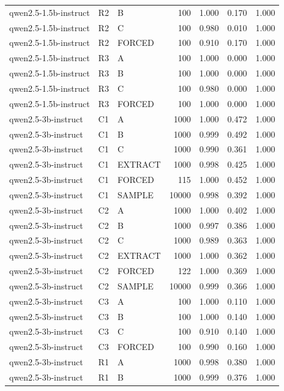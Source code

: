 \begin{table}
\begin{tabular}{lllrrrr}
qwen2.5-1.5b-instruct & R2 & B & 100 & 1.000 & 0.170 & 1.000 \\
qwen2.5-1.5b-instruct & R2 & C & 100 & 0.980 & 0.010 & 1.000 \\
qwen2.5-1.5b-instruct & R2 & FORCED & 100 & 0.910 & 0.170 & 1.000 \\
qwen2.5-1.5b-instruct & R3 & A & 100 & 1.000 & 0.000 & 1.000 \\
qwen2.5-1.5b-instruct & R3 & B & 100 & 1.000 & 0.000 & 1.000 \\
qwen2.5-1.5b-instruct & R3 & C & 100 & 0.980 & 0.000 & 1.000 \\
qwen2.5-1.5b-instruct & R3 & FORCED & 100 & 1.000 & 0.000 & 1.000 \\
qwen2.5-3b-instruct & C1 & A & 1000 & 1.000 & 0.472 & 1.000 \\
qwen2.5-3b-instruct & C1 & B & 1000 & 0.999 & 0.492 & 1.000 \\
qwen2.5-3b-instruct & C1 & C & 1000 & 0.990 & 0.361 & 1.000 \\
qwen2.5-3b-instruct & C1 & EXTRACT & 1000 & 0.998 & 0.425 & 1.000 \\
qwen2.5-3b-instruct & C1 & FORCED & 115 & 1.000 & 0.452 & 1.000 \\
qwen2.5-3b-instruct & C1 & SAMPLE & 10000 & 0.998 & 0.392 & 1.000 \\
qwen2.5-3b-instruct & C2 & A & 1000 & 1.000 & 0.402 & 1.000 \\
qwen2.5-3b-instruct & C2 & B & 1000 & 0.997 & 0.386 & 1.000 \\
qwen2.5-3b-instruct & C2 & C & 1000 & 0.989 & 0.363 & 1.000 \\
qwen2.5-3b-instruct & C2 & EXTRACT & 1000 & 1.000 & 0.362 & 1.000 \\
qwen2.5-3b-instruct & C2 & FORCED & 122 & 1.000 & 0.369 & 1.000 \\
qwen2.5-3b-instruct & C2 & SAMPLE & 10000 & 0.999 & 0.366 & 1.000 \\
qwen2.5-3b-instruct & C3 & A & 100 & 1.000 & 0.110 & 1.000 \\
qwen2.5-3b-instruct & C3 & B & 100 & 1.000 & 0.140 & 1.000 \\
qwen2.5-3b-instruct & C3 & C & 100 & 0.910 & 0.140 & 1.000 \\
qwen2.5-3b-instruct & C3 & FORCED & 100 & 0.990 & 0.160 & 1.000 \\
qwen2.5-3b-instruct & R1 & A & 1000 & 0.998 & 0.380 & 1.000 \\
qwen2.5-3b-instruct & R1 & B & 1000 & 0.999 & 0.376 & 1.000 \\

\end{tabular}
\end{table}
